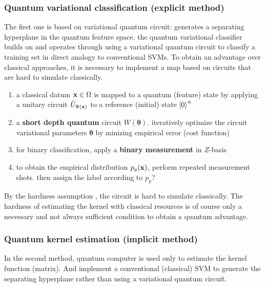 \subsubsection{Quantum variational classification (explicit method)}
The first one is based on variational quantum circuit: generates a separating hyperplane in the quantum feature space.
the quantum variational classifier builds on \cite{mitaraiQuantumCircuitLearning2018} \cite{farhiClassificationQuantumNeural2018} and operates through using a variational quantum circuit to classify a training set in direct analogy to conventional SVMs.
To obtain an advantage over classical approaches, it is necessary to implement a map based on circuits that are hard to simulate classically.
\begin{enumerate}
	\item a classical datum $\vb{x}\in\Omega$ is mapped to a quantum (feature) state by applying a unitary circuit $\hat{U}_{\Phi(\vb{x})}$ to a reference (initial) state $\ket{0}^n$
	\item a \textbf{short depth quantum} circuit $W(\pmb{\theta})$.
	iteratively optimize the circuit variational parameters $\pmb{\theta}$ 
	by minizing empirical error (cost function)
	\item for binary classification, apply a \textbf{binary measurement} in $Z$-basis
	\item to obtain the empirical distribution $p_y(\vb{x})$, perform repeated measurement shots.
	then assign the label according to $p_y$?
\end{enumerate}
By the hardness assumption \cite{bremnerAveragecaseComplexityApproximate2016},
the circuit is hard to simulate classically.
The hardness of estimating the kernel with classical resources is of course only a necessary and not always sufficient condition to obtain a quantum advantage.

\subsubsection{Quantum kernel estimation (implicit method)}
In the second method, quantum computer is used only to estimate the kernel function (matrix).
And implement a conventional (classical) SVM to generate the separating hyperplane
rather than using a variational quantum circuit.

